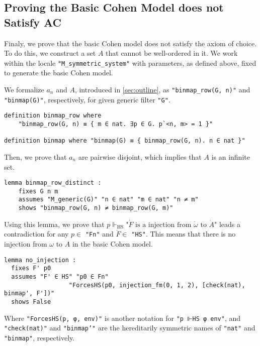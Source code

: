 \documentclass{report}
\newenvironment{isaframe}{\begin{mdframed}[topline=false, rightline=false, bottomline=false]}{\end{mdframed}}
\begin{document}
\subsection{Proving the Basic Cohen Model does not Satisfy AC}
Finaly, we prove that the basic Cohen model does not satisfy the axiom of choice.
To do this, we construct a set $A$ that cannot be well-ordered in it.
We work within the locale \texttt{"M\_symmetric\_system"} with parameters, as defined above, 
fixed to generate the basic Cohen model.

We formalize $a_n$ and $A$, introduced in \cref{sec:outline}, 
as \texttt{"binmap\_row(G, n)"} and \texttt{"binmap(G)"}, respectively, for given generic filter \texttt{"G"}.
\begin{isaframe}
\begin{verbatim}
definition binmap_row where 
    "binmap_row(G, n) ≡ { m ∈ nat. ∃p ∈ G. p`<n, m> = 1 }"

definition binmap where "binmap(G) ≡ { binmap_row(G, n). n ∈ nat }" 
\end{verbatim}
\end{isaframe}
Then, we prove that $a_n$ are pairwise disjoint, which implies that $A$ is an infinite set.
\begin{isaframe}
\begin{verbatim}
lemma binmap_row_distinct : 
    fixes G n m 
    assumes "M_generic(G)" "n ∈ nat" "m ∈ nat" "n ≠ m" 
    shows "binmap_row(G, n) ≠ binmap_row(G, m)" 
\end{verbatim}
\end{isaframe}
Using this lemma, we prove that 
$p \Vdash_{\mathrm{HS}} \text{"} \dot{F} \text{ is a injection from } \dot{\omega} \text{ to } \dot{A} \text{"}$ leads a contradiction 
for any $p \in $ \texttt{"Fn"} and $\dot{F} \in $ \texttt{"HS"}.
This means that there is no injection from $\omega$ to $A$ in the basic Cohen model.
\begin{isaframe}
\begin{verbatim}
lemma no_injection : 
  fixes F' p0
  assumes "F' ∈ HS" "p0 ∈ Fn"  
                  "ForcesHS(p0, injection_fm(0, 1, 2), [check(nat), binmap', F'])" 
  shows False
\end{verbatim}
\end{isaframe}
Where \texttt{"ForcesHS(p, φ, env)"} is another notation for \texttt{"p ⊩HS φ env"},
and \texttt{"check(nat)"} and \texttt{"binmap'"} are the hereditarily symmetric names of \texttt{"nat"} and \texttt{"binmap"}, respectively.
\end{document}
